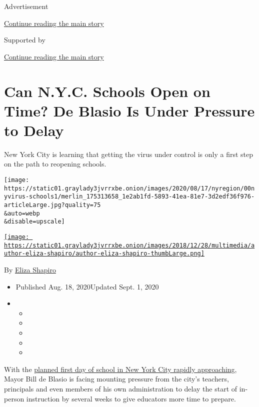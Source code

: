 Advertisement

\protect\hyperlink{after-top}{Continue reading the main story}

Supported by

\protect\hyperlink{after-sponsor}{Continue reading the main story}

\hypertarget{can-nyc-schools-open-on-time-de-blasio-is-under-pressure-to-delay}{%
\section{Can N.Y.C. Schools Open on Time? De Blasio Is Under Pressure to
Delay}\label{can-nyc-schools-open-on-time-de-blasio-is-under-pressure-to-delay}}

New York City is learning that getting the virus under control is only a
first step on the path to reopening schools.

\texttt{[image: https://static01.graylady3jvrrxbe.onion/images/2020/08/17/nyregion/00nyvirus-schools1/merlin\_175313658\_1e2ab1fd-5893-41ea-81e7-3d2edf36f976-articleLarge.jpg?quality=75\\\&auto=webp\\\&disable=upscale]}

\href{https://www.nytimes3xbfgragh.onion/by/eliza-shapiro}{\texttt{[image: https://static01.graylady3jvrrxbe.onion/images/2018/12/28/multimedia/author-eliza-shapiro/author-eliza-shapiro-thumbLarge.png]}}

By \href{https://www.nytimes3xbfgragh.onion/by/eliza-shapiro}{Eliza
Shapiro}

\begin{itemize}
\item
  Published Aug. 18, 2020Updated Sept. 1, 2020
\item
  \begin{itemize}
  \item
  \item
  \item
  \item
  \item
  \end{itemize}
\end{itemize}

With the
\href{https://www.nytimes3xbfgragh.onion/2020/08/05/nyregion/nyc-schools-reopening.html}{planned
first day of school in New York City rapidly approaching}, Mayor Bill de
Blasio is facing mounting pressure from the city's teachers, principals
and even members of his own administration to delay the start of
in-person instruction by several weeks to give educators more time to
prepare.

